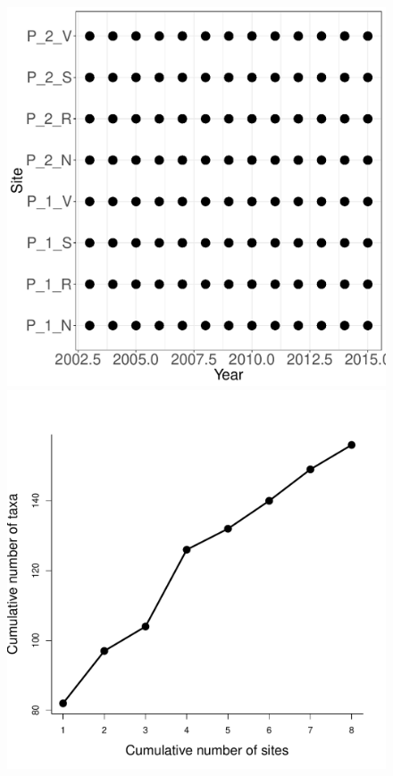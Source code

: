 \documentclass[11pt, oneside]{article}
\begin{document}
\begin{figure}[h!]
\includegraphics[scale = 0.4]{sev-plants-compagnoni_spatiotemporal_sampling_effort.pdf}
\includegraphics[scale = 0.4]{sev-plants-compagnoni_species_accumulation_space.pdf}

\end{figure}
\end{document}
